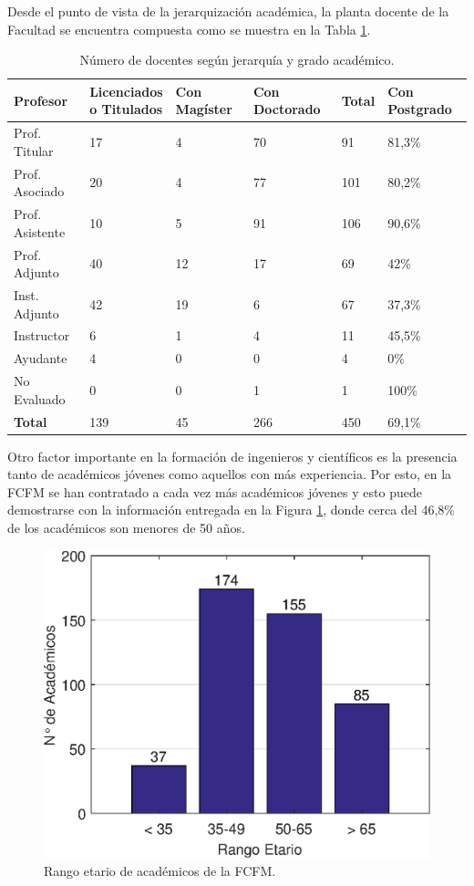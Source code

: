 Desde el punto de vista de la jerarquización académica, la planta docente de la Facultad se
encuentra compuesta como se muestra en la Tabla \ref{jer_vs_grado}.

\begin{table}[hb!]
\centering
\caption{Número de docentes según jerarquía y grado académico.}
\label{jer_vs_grado}
\begin{tabular}{llllll}
\hline
Profesor        & \shortstack{Licenciados \\ o Titulados} & Con Magíster & Con Doctorado & Total & Con Postgrado \\ \hline \hline
Prof. Titular   & 17    & 4    & 70    & 91    & 81,3\%          \\ \hline
Prof. Asociado  & 20    & 4    & 77    & 101    & 80,2\%          \\ \hline
Prof. Asistente & 10    & 5    & 91    & 106    & 90,6\%          \\ \hline
Prof. Adjunto   & 40    & 12    & 17    & 69    & 42\%          \\ \hline
Inst. Adjunto   & 42    & 19    & 6    & 67    & 37,3\%          \\ \hline
Instructor      & 6    & 1    & 4    & 11    & 45,5\%          \\ \hline
Ayudante        & 4    & 0    & 0    & 4    & 0\%           \\ \hline
No Evaluado     & 0    & 0    & 1    & 1    & 100\%         \\ \hline
\textbf{Total}  & 139 & 45 & 266 & 450 & 69,1\%          \\ \hline
\end{tabular}
\end{table}

Otro factor importante en la formación de ingenieros y científicos es la presencia tanto de
académicos jóvenes como aquellos con más experiencia. Por esto, en la FCFM se han contratado
a cada vez más académicos jóvenes y esto puede demostrarse con la información entregada en la
Figura \ref{etario}, donde cerca del 46,8\% de los académicos son menores de 50 años.

\begin{figure}[ht!]
\centering
\includegraphics[width=0.65\columnwidth]{./pictures/etario.eps}
\caption{Rango etario de académicos de la FCFM.}
\label{etario}
\end{figure}

